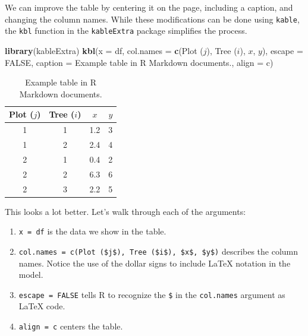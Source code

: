 \documentclass[
]{krantz}
\newenvironment{Shaded}{\begin{snugshade}}{\end{snugshade}}
\newcommand{\DataTypeTok}[1]{\textcolor[rgb]{0.13,0.29,0.53}{#1}}
\newcommand{\KeywordTok}[1]{\textcolor[rgb]{0.13,0.29,0.53}{\textbf{#1}}}
\newcommand{\NormalTok}[1]{#1}
\newcommand{\OtherTok}[1]{\textcolor[rgb]{0.56,0.35,0.01}{#1}}
\newcommand{\StringTok}[1]{\textcolor[rgb]{0.31,0.60,0.02}{#1}}
\providecommand{\tightlist}{%
  \setlength{\itemsep}{0pt}\setlength{\parskip}{0pt}}
\begin{document}
We can improve the table by centering it on the page, including a caption, and changing the column names. While these modifications can be done using \texttt{kable}, the \texttt{kbl} function in the \texttt{kableExtra} package simplifies the process.

\begin{Shaded}
\begin{Highlighting}[]
\KeywordTok{library}\NormalTok{(kableExtra)}
\KeywordTok{kbl}\NormalTok{(}\DataTypeTok{x =}\NormalTok{ df,}
    \DataTypeTok{col.names =} \KeywordTok{c}\NormalTok{(}\StringTok{\textquotesingle{}Plot ($j$)\textquotesingle{}}\NormalTok{, }\StringTok{\textquotesingle{}Tree ($i$)\textquotesingle{}}\NormalTok{, }\StringTok{\textquotesingle{}$x$\textquotesingle{}}\NormalTok{, }\StringTok{\textquotesingle{}$y$\textquotesingle{}}\NormalTok{),}
    \DataTypeTok{escape =} \OtherTok{FALSE}\NormalTok{,}
    \DataTypeTok{caption =} \StringTok{\textquotesingle{}Example table in R Markdown documents.\textquotesingle{}}\NormalTok{,}
    \DataTypeTok{align =} \StringTok{\textquotesingle{}c\textquotesingle{}}\NormalTok{)}
\end{Highlighting}
\end{Shaded}

\begin{table}[!h]

\caption{\label{tab:exampleKableTable}Example table in R Markdown documents.}
\centering
\begin{tabular}[t]{c|c|c|c}
\hline
Plot ($j$) & Tree ($i$) & $x$ & $y$\\
\hline
1 & 1 & 1.2 & 3\\
\hline
1 & 2 & 2.4 & 4\\
\hline
2 & 1 & 0.4 & 2\\
\hline
2 & 2 & 6.3 & 6\\
\hline
2 & 3 & 2.2 & 5\\
\hline
\end{tabular}
\end{table}

This looks a lot better. Let's walk through each of the arguments:

\begin{enumerate}
\def\labelenumi{\arabic{enumi}.}
\tightlist
\item
  \texttt{x\ =\ df} is the data we show in the table.
\item
  \texttt{col.names\ =\ c(\textquotesingle{}Plot\ (\$j\$)\textquotesingle{},\ \textquotesingle{}Tree\ (\$i\$)\textquotesingle{},\ \textquotesingle{}\$x\$\textquotesingle{},\ \textquotesingle{}\$y\$\textquotesingle{})} describes the column names. Notice the use of the dollar signs to include LaTeX notation in the model.
\item
  \texttt{escape\ =\ FALSE} tells R to recognize the \texttt{\$} in the \texttt{col.names} argument as LaTeX code.
\item
  \texttt{align\ =\ \textquotesingle{}c\textquotesingle{}} centers the table.
\end{enumerate}
\end{document}
